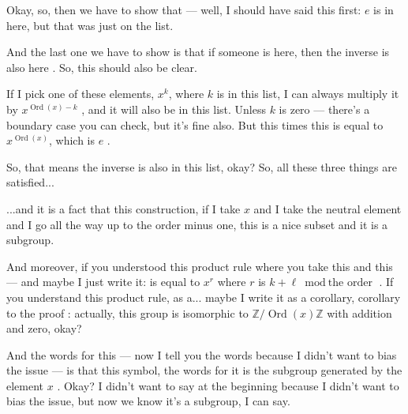 \begin{speech}[00:05:35 - 00:06:33]
Okay, so, then we have to show that --- well, I should have said this first: $e$ is in here, but that was  just on the list.

And the last one we have to show is that if someone is here, then the inverse is also here . So, this should also be clear.

If I pick one of these elements, $x^k$, where $k$ is in this list, I can always multiply it by $x^{\operatorname{Ord}(x) - k}$ , and it will also be in this list. Unless $k$ is zero --- there's a boundary case you can check, but it's fine also. But this times this is equal to $x^{\operatorname{Ord}(x)}$, which is $e$ .

So, that means the inverse is also in this list, okay? So, all these three things are satisfied...
\end{speech}

\begin{speech}[00:06:33 - 00:07:49]
...and it is a fact that this construction, if I take $x$ and I take the neutral element and I go all the way up to the order minus one, this is a nice subset and it is a subgroup.

And moreover, if you understood this product rule where you take this and this --- and maybe I just write it: is equal to $x^r$ where $r$ is $k+\ell \bmod \text{the order}$ . If you understand this product rule, as a... maybe I write it as a corollary, corollary to the proof : actually, this group is isomorphic to $\mathbb{Z} / \operatorname{Ord}(x)\mathbb{Z}$ with addition and zero, okay?

And the words for this --- now I tell you the words because I didn't want to bias the issue --- is that this symbol, the words for it is the subgroup generated by the element $x$ . Okay? I didn't want to say at the beginning because I didn't want to bias the issue, but now we know it's a subgroup, I can say.
\end{speech}


